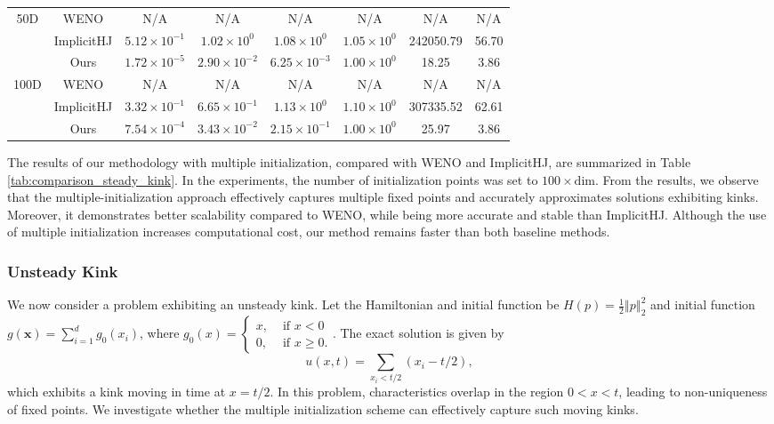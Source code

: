 \documentclass[review,hidelinks,onefignum,onetabnum]{siamart250106}
\newcommand{\bx}{\mathbf{x}}
\begin{document}
\begin{table}[ht]
{\begin{tabular}{c|c|cccccc}
\hline
50D & WENO & N/A & N/A & N/A & N/A & N/A & N/A \\
    & ImplicitHJ & $5.12\times10^{-1}$ & $1.02\times10^{0}$ & $1.08\times10^{0}$ & $1.05\times10^{0}$ & 242050.79 & 56.70 \\
    & Ours & $1.72\times10^{-5}$ & $2.90\times10^{-2}$ & $6.25\times10^{-3}$ & $1.00\times10^{0}$ & 18.25 & 3.86 \\
\hline
100D & WENO & N/A & N/A & N/A & N/A & N/A & N/A \\
     & ImplicitHJ & $3.32\times10^{-1}$ & $6.65\times10^{-1}$ & $1.13\times10^{0}$ & $1.10\times10^{0}$ & 307335.52 & 62.61 \\
     & Ours & $7.54\times10^{-4}$ & $3.43\times10^{-2}$ & $2.15\times10^{-1}$ & $1.00\times10^{0}$ & 25.97 & 3.86 \\
\hline
\end{tabular}%
}
\end{table}

The results of our methodology with multiple initialization, compared with WENO and ImplicitHJ, are summarized in Table \ref{tab:comparison_steady_kink}. In the experiments, the number of initialization points was set to $100 \times \text{dim}$. 
From the results, we observe that the multiple-initialization approach effectively captures multiple fixed points and accurately approximates solutions exhibiting kinks. Moreover, it demonstrates better scalability compared to WENO, while being more accurate and stable than ImplicitHJ. Although the use of multiple initialization increases computational cost, our method remains faster than both baseline methods.


\subsubsection{Unsteady Kink}
We now consider a problem exhibiting an unsteady kink. Let the Hamiltonian and initial function be
 $H\left(p\right) = \frac{1}{2}\left\Vert p\right\Vert_2^2$ and initial function $g\left(\bx\right) = \sum_{i=1}^d g_0(x_i)$, where $g_0(x)=\begin{cases}
     x,&\text{ if } x<0\\
      0,&\text{ if } x\geq 0. 
      \end{cases}. $
The exact solution is given by
\[
u(x,t) = \sum_{x_i < t/2} (x_i - t/2),
\]
which exhibits a kink moving in time at \(x = t/2\). In this problem, characteristics overlap in the region \(0 < x < t\), leading to non-uniqueness of fixed points. We investigate whether the multiple initialization scheme can effectively capture such moving kinks.
\end{document}
